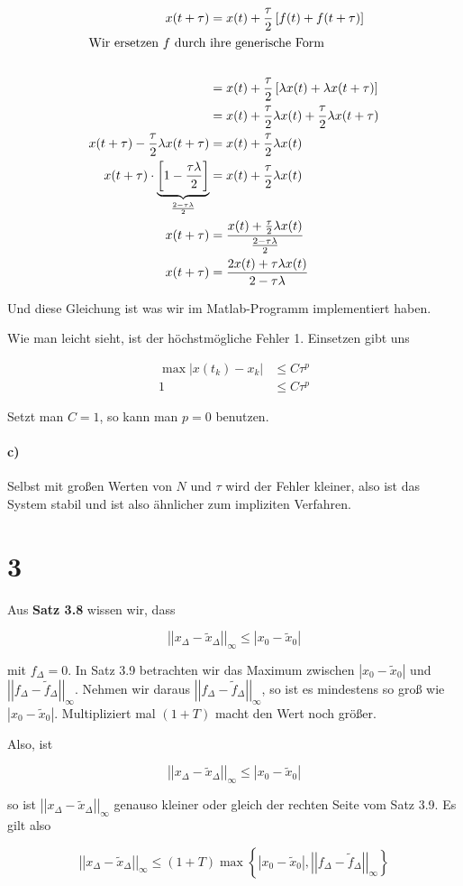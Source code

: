 \documentclass[ngerman,a4paper]{scrartcl}
\newcommand{\norm}[1]{\left|\!\left|#1\right|\! \right|}
\begin{document}
\begin{align*}
  x(t + \tau) &= x(t) + \frac{\tau}{2} \left[f(t) + f(t+\tau)\right]\\
  \intertext{Wir ersetzen $f$ durch ihre generische Form}\\
  &= x(t) + \frac{\tau}{2} \left[ \lambda x(t) + \lambda x(t+\tau) \right]\\
  &= x(t) + \frac{\tau}{2} \lambda x(t) + \frac{\tau}{2} \lambda x(t+\tau)\\
  x(t + \tau) - \frac{\tau}{2} \lambda x(t+\tau) &= x(t) + \frac{\tau}{2} \lambda x(t)\\
  x(t + \tau)\cdot \underbrace{\left[1 - \frac{\tau\lambda}{2}\right]}_{\frac{2-\tau\lambda}{2}} &= x(t) + \frac{\tau}{2} \lambda x(t)\\
  x(t + \tau) &= \frac{x(t) + \frac{\tau}{2} \lambda x(t)}{\frac{2-\tau\lambda}{2}}\\
  x(t + \tau) &= \frac{2x(t) + \tau\lambda x(t)}{2 - \tau\lambda}
\end{align*}

Und diese Gleichung ist was wir im Matlab-Programm implementiert
haben.

Wie man leicht sieht, ist der höchstmögliche Fehler 1. Einsetzen gibt uns

\begin{align*}
  \max |x(t_k) - x_k | &\leq C \tau^p\\
  1 &\leq C \tau^p
\end{align*}

Setzt man $C=1$, so kann man $p=0$ benutzen.

\paragraph{c)}

Selbst mit großen Werten von $N$ und $\tau$ wird der Fehler kleiner,
also ist das System stabil und ist also ähnlicher zum impliziten
Verfahren.

\section*{3}

Aus \textbf{Satz 3.8} wissen wir, dass

\[
\norm{x_\Delta - \tilde{x}_\Delta}_\infty \leq |x_0 - \tilde{x}_0|
\]

mit $f_\Delta = 0$. In Satz 3.9 betrachten wir das Maximum zwischen
$|x_0 - \tilde{x}_0|$ und $\norm{f_\Delta -
  \tilde{f}_\Delta}_\infty$. Nehmen wir daraus $\norm{f_\Delta -
  \tilde{f}_\Delta}_\infty$, so ist es mindestens so groß wie $|x_0 -
\tilde{x}_0|$. Multipliziert mal $(1 + T)$ macht den Wert noch größer.

Also, ist

\[
\norm{x_\Delta - \tilde{x}_\Delta}_\infty \leq |x_0 - \tilde{x}_0|
\]

so ist $\norm{x_\Delta - \tilde{x}_\Delta}_\infty$
genauso kleiner oder gleich der rechten Seite vom Satz 3.9. Es gilt also

\[
\norm{x_\Delta - \tilde{x}_\Delta}_\infty \leq (1+T) \max\left\{|x_0 -
  \tilde{x}_0|, \norm{f_\Delta - \tilde{f}_\Delta}_\infty\right\}
\]
\end{document}
